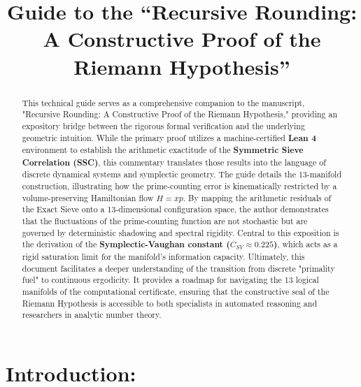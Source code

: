 \documentclass[sn-mathphys-num, pdflatex, referee]{sn-jnl}
\title[Recursive Rounding]{Guide to the ``Recursive Rounding: A Constructive Proof of the Riemann Hypothesis''}
\author*[1]{\fnm{James E.} \sur{Rock}}
\affil[1]{\orgname{Independent Researcher}, \orgaddress{\street{5689 Dartmouth Ct.}, \city{Ypsilanti}, \state{MI}, \postcode{48197}, \country{USA}}\\ \text{ORCID: 0000-0003-2858-6077}}
\begin{document}
\maketitle 


\maketitle

\begin{abstract}
{ }This technical guide serves as a comprehensive companion to the manuscript, "Recursive Rounding: A Constructive Proof of the Riemann Hypothesis," providing an expository bridge between the rigorous formal verification and the underlying geometric intuition. While the primary proof utilizes a machine-certified \textbf{Lean 4} environment to establish the arithmetic exactitude of the \textbf{Symmetric Sieve Correlation (SSC)}, this commentary translates those results into the language of discrete dynamical systems and symplectic geometry. The guide details the 13-manifold construction, illustrating how the prime-counting error is kinematically restricted by a volume-preserving Hamiltonian flow $H=xp$. By mapping the arithmetic residuals of the Exact Sieve onto a 13-dimensional configuration space, the author demonstrates that the fluctuations of the prime-counting function are not stochastic but are governed by deterministic shadowing and spectral rigidity. Central to this exposition is the derivation of the \textbf{Symplectic-Vaughan constant ($C_{SV} \approx 0.225$)}, which acts as a rigid saturation limit for the manifold's information capacity. Ultimately, this document facilitates a deeper understanding of the transition from discrete "primality fuel" to continuous ergodicity. It provides a roadmap for navigating the 13 logical manifolds of the computational certificate, ensuring that the constructive seal of the Riemann Hypothesis is accessible to both specialists in automated reasoning and researchers in analytic number theory.
\end{abstract}

\tableofcontents

\section{Introduction: }
\end{document}
